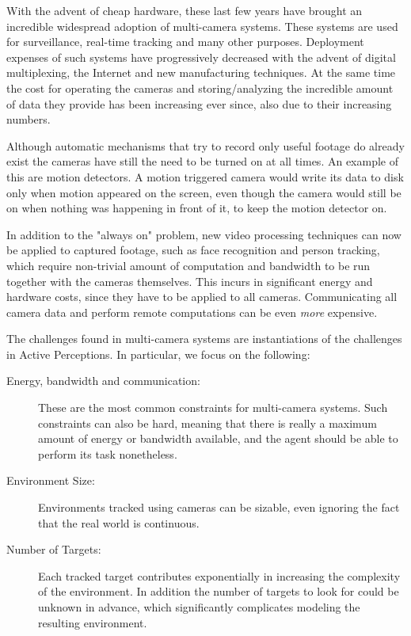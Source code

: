 With the advent of cheap hardware, these last few years have brought an incredible widespread
adoption of multi-camera systems. These systems are used for surveillance, real-time tracking and
many other purposes. Deployment expenses of such systems have progressively decreased with the
advent of digital multiplexing, the Internet and new manufacturing techniques. At the same time the
cost for operating the cameras and storing/analyzing the incredible amount of data they provide has
been increasing ever since, also due to their increasing numbers.

Although automatic mechanisms that try to record only useful footage do already exist the cameras
have still the need to be turned on at all times. An example of this are motion detectors. A motion
triggered camera would write its data to disk only when motion appeared on the screen, even though
the camera would still be on when nothing was happening in front of it, to keep the motion detector
on.

In addition to the "always on" problem, new video processing techniques can now be applied to
captured footage, such as face recognition and person tracking, which require non-trivial amount of
computation and bandwidth to be run together with the cameras themselves. This incurs in significant
energy and hardware costs, since they have to be applied to all cameras. Communicating all camera
data and perform remote computations can be even \textit{more} expensive.

The challenges found in multi-camera systems are instantiations of the challenges in Active
Perceptions. In particular, we focus on the following:

\begin{description}
\item[Energy, bandwidth and communication:] These are the most common constraints for multi-camera
    systems. Such constraints can also be hard, meaning that there is really a maximum amount of
    energy or bandwidth available, and the agent should be able to perform its task nonetheless.
\item[Environment Size:] Environments tracked using cameras can be sizable, even ignoring the fact
    that the real world is continuous.
\item[Number of Targets:] Each tracked target contributes exponentially in increasing the complexity
    of the environment. In addition the number of targets to look for could be unknown in advance,
    which significantly complicates modeling the resulting environment.
\end{description}

